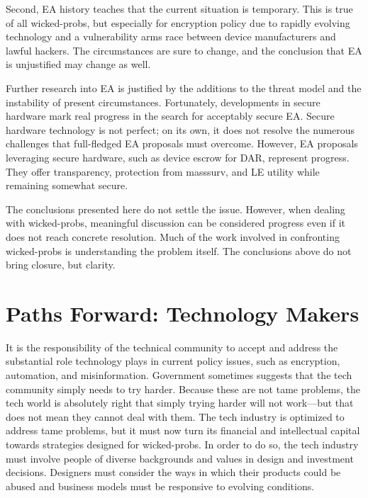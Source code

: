 Second, \ac{EA} history teaches that the current situation is temporary. This is true of all \acp{wicked-prob}, but
especially for encryption policy due to rapidly evolving technology and a vulnerability arms race between device
manufacturers and lawful hackers. The circumstances are sure to change, and the conclusion that \ac{EA} is unjustified
may change as well.


Further research into \ac{EA} is justified by the additions to the threat model and the instability of present
circumstances. Fortunately, developments in secure hardware mark real progress in the search for acceptably secure
\ac{EA}. Secure hardware technology is not perfect; on its own, it does not resolve the numerous challenges that
full-fledged \ac{EA} proposals must overcome. However, \ac{EA} proposals leveraging secure hardware, such as device
escrow for \acl{DAR}, represent progress. They offer transparency, protection from \ac{masssurv}, and \acl{LE} utility
while remaining somewhat secure.

The conclusions presented here do not settle the issue. However, when dealing with \acp{wicked-prob}, meaningful
discussion can be considered progress even if it does not reach concrete resolution. Much of the work involved in
confronting \acp{wicked-prob} is understanding the problem itself. The conclusions above do not bring closure, but
clarity.


\section{Paths Forward: Technology Makers}

It is the responsibility of the technical community to accept and address the substantial role technology plays in
current policy issues, such as encryption, automation, and misinformation. Government sometimes suggests that the tech
community simply needs to try harder. Because these are not tame problems, the tech world is absolutely right that
simply trying harder will not work---but that does not mean they cannot deal with them. The tech industry is optimized
to address tame problems, but it must now turn its financial and intellectual capital towards strategies designed for
\acp{wicked-prob}. In order to do so, the tech industry must involve people of diverse backgrounds and values in design
and investment decisions. Designers must consider the ways in which their products could be abused and business models
must be responsive to evolving conditions.

